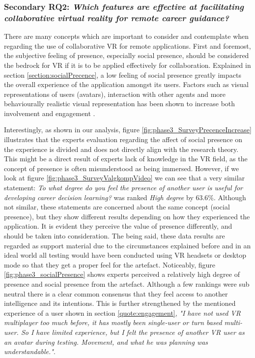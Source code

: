 \subsubsection{Secondary RQ2: \textit{Which features are effective at facilitating collaborative virtual reality for remote
career guidance?}} 
There are many concepts which are important to consider and contemplate when regarding the use of collaborative VR for remote applications. First and foremost, the subjective feeling of presence, especially social presence, should be considered the bedrock for VR if it is to be applied effectively for collaboration. Explained in section \ref{section:socialPrecence}, a low feeling of social presence greatly impacts the overall experience of the application amongst its users. Factors such as visual representations of users (avatars), interaction with other agents and more behaviourally realistic visual representation has been shown to increase both involvement and engagement \cite{skalski2007role} \cite{oh2018systematic}. 

Interestingly, as shown in our analysis, figure \ref{fig:phase3_SurveyPrecenceIncrease} illustrates that the experts evaluation regarding the affect of social presence on the experience is divided and does not directly align with the research theory. This might be a direct result of experts lack of knowledge in the VR field, as the concept of presence is often misunderstood as being immersed. However, if we look at figure \ref{fig:phase3_SurveyValgkompVideo} we can see that a very similar statement: \textit{To what degree do you feel the presence of another user is useful for developing career decision learning?} was ranked \textit{High degree} by 63.6\%. Although not similar, these statements are concerned about the same concept (social presence), but they show different results depending on how they experienced the application. It is evident they perceive the value of presence differently, and should be taken into consideration. The being said, these data results are regarded as support material due to the circumstances explained before and in an ideal world all testing would have been conducted using VR headsets or desktop mode so that they get a proper feel for the artefact. 
Noticeably,  figure \ref{fig:phase3_socialPresence} shows experts perceived a relatively high degree of presence and social presence from the artefact. Although a few rankings were sub neutral there is a clear common consensus that they feel access to another intelligence and its intentions. This is further strengthened by the mentioned experience of a user shown in section \ref{quote:engagement}, 
\textit{"I have not used VR multiplayer too much before, it has mostly been single-user or turn based multi-user. So I have limited experience, but I felt the presence of another VR user as an avatar during testing.  Movement, and what he was planning was understandable."}.


